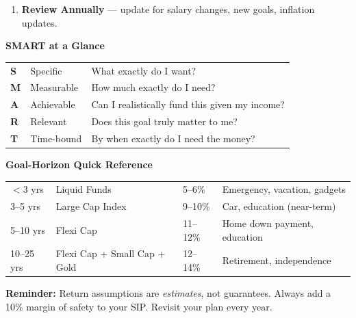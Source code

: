 \documentclass[12pt,a4paper]{article}
\begin{document}
\begin{cheatsheet}
\begin{enumerate}[label=\textbf{Step \arabic*:}, leftmargin=*, align=left]
  \item \textbf{Review Annually} --- update for salary changes, new goals, inflation updates.

\end{enumerate}

\bigskip

\textbf{\color{PrimaryBlue}\large SMART at a Glance}

\medskip
\begin{tabular}{lll}
\textbf{S} & Specific & What exactly do I want?\\
\textbf{M} & Measurable & How much exactly do I need?\\
\textbf{A} & Achievable & Can I realistically fund this given my income?\\
\textbf{R} & Relevant & Does this goal truly matter to me?\\
\textbf{T} & Time-bound & By when exactly do I need the money?\\
\end{tabular}

\bigskip

\textbf{\color{PrimaryBlue}\large Goal-Horizon Quick Reference}

\medskip
\begin{tabularx}{\linewidth}{@{}L{1.7cm} L{3.5cm} L{1.7cm} X@{}}
$<$3 yrs & Liquid Funds & 5--6\% & Emergency, vacation, gadgets\\
3--5 yrs & Large Cap Index & 9--10\% & Car, education (near-term)\\
5--10 yrs & Flexi Cap & 11--12\% & Home down payment, education\\
10--25 yrs & Flexi Cap + Small Cap + Gold & 12--14\% & Retirement, independence\\
\end{tabularx}

\bigskip

\textbf{\color{AccentRed}\small Reminder:} Return assumptions are \textit{estimates}, not guarantees.
Always add a 10\% margin of safety to your SIP. Revisit your plan every year.

\end{cheatsheet}
\end{document}
